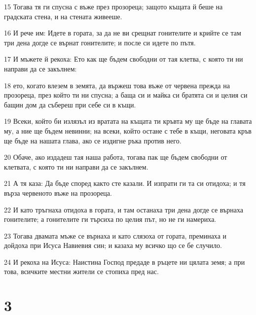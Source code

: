 \par 15 Тогава тя ги спусна с въже през прозореца; защото къщата й беше на градската стена, и на стената живееше.
\par 16 И рече им: Идете в гората, за да не ви срещнат гонителите и крийте се там три дена догде се върнат гонителите; и после си идете по пътя.
\par 17 И мъжете й рекоха: Ето как ще бъдем свободни от тая клетва, с която ти ни направи да се закълнем:
\par 18 ето, когато влезем в земята, да вържеш това въже от червена прежда на прозореца, през който ти ни спусна; а баща си и майка си братята си и целия си бащин дом да събереш при себе си в къщи.
\par 19 Всеки, който би излязъл из вратата на къщата ти кръвта му ще бъде на главата му, а ние ще бъдем невинни; на всеки, който остане с тебе в къщи, неговата кръв ще бъде на нашата глава, ако се издигне ръка против него.
\par 20 Обаче, ако издадеш тая наша работа, тогава пак ще бъдем свободни от клетвата, с която ти ни направи да се закълнем.
\par 21 А тя каза: Да бъде според както сте казали. И изпрати ги та си отидоха; и тя върза червеното въже на прозореца.
\par 22 И като тръгнаха отидоха в гората, и там останаха три дена догде се върнаха гонителите; а гонителите ги търсиха по целия път, но не ги намериха.
\par 23 Тогава двамата мъже се върнаха и като слязоха от гората, преминаха и дойдоха при Исуса Навиевия син; и казаха му всичко що се бе случило.
\par 24 И рекоха на Исуса: Наистина Господ предаде в ръцете ни цялата земя; а при това, всичките местни жители се стопиха пред нас.

\chapter{3}

